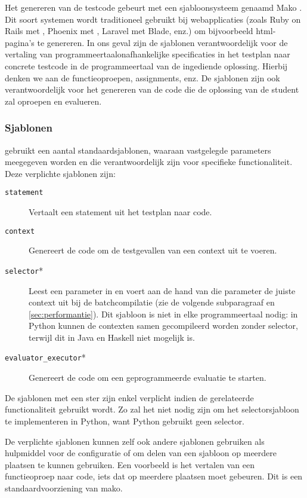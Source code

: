 Het genereren van de testcode gebeurt met een sjabloonsysteem genaamd Mako \autocite{mako}.
Dit soort systemen wordt traditioneel gebruikt bij webapplicaties (zoals Ruby on Rails met , Phoenix met , Laravel met Blade, enz.) om bijvoorbeeld html-pagina's te genereren.
In ons geval zijn de sjablonen verantwoordelijk voor de vertaling van programmeertaalonafhankelijke specificaties in het testplan naar concrete testcode in de programmeertaal van de ingediende oplossing.
Hierbij denken we aan de functieoproepen, assignments, enz.
De sjablonen zijn ook verantwoordelijk voor het genereren van de code die de oplossing van de student zal oproepen en evalueren.

\subsubsection{Sjablonen}

\tested{} gebruikt een aantal standaardsjablonen, waaraan vastgelegde parameters meegegeven worden en die verantwoordelijk zijn voor specifieke functionaliteit.
Deze verplichte sjablonen zijn:

\begin{description}
    \item[\texttt{statement}] Vertaalt een statement uit het testplan naar code.
    \item[\texttt{context}] Genereert de code om de testgevallen van een context uit te voeren.
    \item[\texttt{selector}*] Leest een parameter in en voert aan de hand van die parameter de juiste context uit bij de batchcompilatie (zie de volgende subparagraaf en \cref{sec:performantie}).
    Dit sjabloon is niet in elke programmeertaal nodig: in Python kunnen de contexten samen gecompileerd worden zonder selector, terwijl dit in Java en Haskell niet mogelijk is.
    \item[\texttt{evaluator\_executor}*] Genereert de code om een geprogrammeerde evaluatie te starten.
\end{description}

De sjablonen met een ster zijn enkel verplicht indien de gerelateerde functionaliteit gebruikt wordt.
Zo zal het niet nodig zijn om het selectorsjabloon te implementeren in Python, want Python gebruikt geen selector.

De verplichte sjablonen kunnen zelf ook andere sjablonen gebruiken als hulpmiddel voor de configuratie of om delen van een sjabloon op meerdere plaatsen te kunnen gebruiken.
Een voorbeeld is het vertalen van een functieoproep naar code, iets dat op meerdere plaatsen moet gebeuren.
Dit is een standaardvoorziening van mako.

